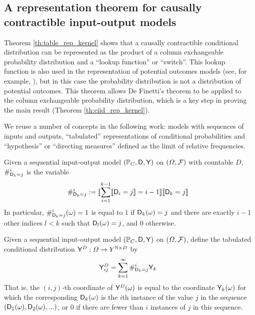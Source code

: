 \subsection[Representation theorem]{A representation theorem for causally contractible input-output models}\label{sec:rep_theorem}

Theorem \ref{th:table_rep_kernel} shows that a causally contractible conditional distribution can be represented as the product of a column exchangeable probability distribution and a ``lookup function'' or ``switch''. This lookup function is also used in the representation of potential outcomes models (see, for example, \citet{rubin_causal_2005}), but in this case the probability distribution is not a distribution of potential outcomes. This theorem allows De Finetti's theorem to be applied to the column exchangeable probability distribution, which is a key step in proving the main result (Theorem \ref{th:ciid_rep_kernel}).

We reuse a number of concepts in the following work: models with sequences of inputs and outputs, ``tabulated'' representations of conditional probabilities and ``hypothesis'' or ``directing measures'' defined as the limit of relative frequencies.

\begin{definition}
Given a sequential input-output model $(\mathbb{P}_C,\mathsf{D},\mathsf{Y})$ on $(\Omega,\mathcal{F})$ with countable $D$, $\#_{\mathsf{D}_k=j}^i$ is the variable
\begin{align}
    \#_{\mathsf{D}_k=j}^i := \llbracket \sum_{i=1}^{k-1} \llbracket \mathsf{D}_i = j \rrbracket = i-1\rrbracket\llbracket \mathsf{D}_k = j \rrbracket
\end{align}
In particular, $\#_{\mathsf{D}_k=j}^i(\omega)=1$ is equal to $1$ if $\mathsf{D}_k(\omega)=j$ and there are exactly $i-1$ other indices $l<k$ such that $\mathsf{D}_l(\omega)=j$, and 0 otherwise.
\end{definition}

\begin{definition}\label{def:tab_cd}
Given a sequential input-output model $(\mathbb{P}_C,\mathsf{D},\mathsf{Y})$ on $(\Omega,\mathcal{F})$, define the tabulated conditional distribution $\mathsf{Y}^D:\Omega\to Y^{\mathbb{N}\times D}$ by
\begin{align}
    \mathsf{Y}^D_{ij} = \sum_{k=1}^{\infty} \#_{\mathsf{D}_k=j}^i \mathsf{Y}_k
\end{align}
That is, the $(i,j)$-th coordinate of $\mathsf{Y}^D(\omega)$ is equal to the coordinate $\mathsf{Y}_k(\omega)$ for which the corresponding $\mathsf{D}_k(\omega)$ is the $i$th instance of the value $j$ in the sequence $(\mathsf{D}_1(\omega),\mathsf{D}_2(\omega),...)$, or 0 if there are fewer than $i$ instances of $j$ in this sequence.
\end{definition}

